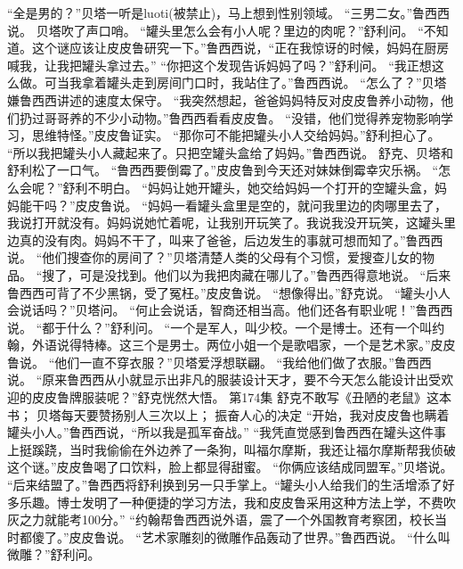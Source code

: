 \documentclass[a4paper,12pt,UTF8,twoside]{ctexbook}
\begin{document}
        “全是男的？”贝塔一听是luoti(被禁止)，马上想到性别领域。 
        “三男二女。”鲁西西说。 
        贝塔吹了声口哨。 
        “罐头里怎么会有小人呢？里边的肉呢？”舒利问。 
        “不知道。这个谜应该让皮皮鲁研究一下。”鲁西西说，“正在我惊讶的时候，妈妈在厨房喊我，让我把罐头拿过去。” 
        “你把这个发现告诉妈妈了吗？”舒利问。 
        “我正想这么做。可当我拿着罐头走到房间门口时，我站住了。”鲁西西说。 
        “怎么了？”贝塔嫌鲁西西讲述的速度太保守。 
        “我突然想起，爸爸妈妈特反对皮皮鲁养小动物，他们扔过哥哥养的不少小动物。”鲁西西看看皮皮鲁。 
        “没错，他们觉得养宠物影响学习，思维特怪。”皮皮鲁证实。 
        “那你可不能把罐头小人交给妈妈。”舒利担心了。 
        “所以我把罐头小人藏起来了。只把空罐头盒给了妈妈。”鲁西西说。 
        舒克、贝塔和舒利松了一口气。 
        “鲁西西要倒霉了。”皮皮鲁到今天还对妹妹倒霉幸灾乐祸。 
        “怎么会呢？”舒利不明白。 
        “妈妈让她开罐头，她交给妈妈一个打开的空罐头盒，妈妈能干吗？”皮皮鲁说。 
        “妈妈一看罐头盒里是空的，就问我里边的肉哪里去了，我说打开就没有。妈妈说她忙着呢，让我别开玩笑了。我说我没开玩笑，这罐头里边真的没有肉。妈妈不干了，叫来了爸爸，后边发生的事就可想而知了。”鲁西西说。 
        “他们搜查你的房间了？”贝塔清楚人类的父母有个习惯，爱搜查儿女的物品。 
        “搜了，可是没找到。他们以为我把肉藏在哪儿了。”鲁西西得意地说。 
        “后来鲁西西可背了不少黑锅，受了冤枉。”皮皮鲁说。 
        “想像得出。”舒克说。 
        “罐头小人会说话吗？”贝塔问。 
        “何止会说话，智商还相当高。他们还各有职业呢！”鲁西西说。 
        “都于什么？”舒利问。 
        “一个是军人，叫少校。一个是博士。还有一个叫约翰，外语说得特棒。这三个是男士。两位小姐一个是歌唱家，一个是艺术家。”皮皮鲁说。 
        “他们一直不穿衣服？”贝塔爱浮想联翩。 
        “我给他们做了衣服。”鲁西西说。 
        “原来鲁西西从小就显示出非凡的服装设计天才，要不今天怎么能设计出受欢迎的皮皮鲁牌服装呢？”舒克恍然大悟。   第174集 
        舒克不敢写《丑陋的老鼠》这本书； 
        贝塔每天要赞扬别人三次以上； 
        振奋人心的决定   
        “开始，我对皮皮鲁也瞒着罐头小人。”鲁西西说，“所以我是孤军奋战。” 
        “我凭直觉感到鲁西西在罐头这件事上挺蹊跷，当时我偷偷在外边养了一条狗，叫福尔摩斯，我还让福尔摩斯帮我侦破这个谜。”皮皮鲁喝了口饮料，脸上都显得甜蜜。 
        “你俩应该结成同盟军。”贝塔说。 
        “后来结盟了。”鲁西西将舒利换到另一只手掌上。“罐头小人给我们的生活增添了好多乐趣。博士发明了一种便捷的学习方法，我和皮皮鲁采用这种方法上学，不费吹灰之力就能考100分。” 
        “约翰帮鲁西西说外语，震了一个外国教育考察团，校长当时都傻了。”皮皮鲁说。 
        “艺术家雕刻的微雕作品轰动了世界。”鲁西西说。 
        “什么叫微雕？”舒利问。 
\end{document}

